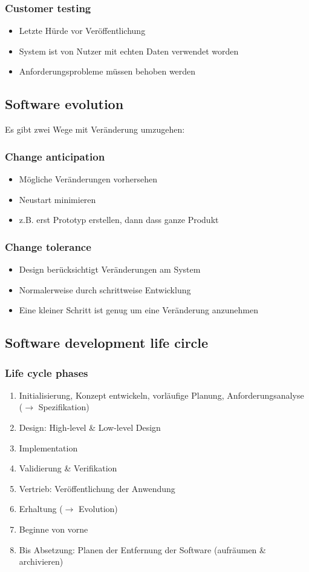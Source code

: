 \subsubsection{Customer testing}
\begin{itemize}
	\item Letzte Hürde vor Veröffentlichung
	\item System ist von Nutzer mit echten Daten verwendet worden
	\item Anforderungsprobleme müssen behoben werden
\end{itemize}
\subsection{Software evolution}
Es gibt zwei Wege mit Veränderung umzugehen:
\subsubsection{Change anticipation}
\begin{itemize}
	\item Mögliche Veränderungen vorhersehen
	\item Neustart minimieren
	\item z.B. erst Prototyp erstellen, dann dass ganze Produkt
\end{itemize}
\subsubsection{Change tolerance}
\begin{itemize}
	\item Design berücksichtigt Veränderungen am System
	\item Normalerweise durch schrittweise Entwicklung
	\item Eine kleiner Schritt ist genug um eine Veränderung anzunehmen
\end{itemize}
\subsection{Software development life circle}
\subsubsection{Life cycle phases}
\begin{enumerate}
	\item Initialisierung, Konzept entwickeln, vorläufige Planung, Anforderungsanalyse ($\rightarrow$ Spezifikation)
	\item Design: High-level \& Low-level Design
	\item Implementation
	\item Validierung \& Verifikation
	\item Vertrieb: Veröffentlichung der Anwendung
	\item Erhaltung ($\rightarrow$ Evolution)
	\item Beginne von vorne
	\item Bis Absetzung: Planen der Entfernung der Software (aufräumen \& archivieren) 
\end{enumerate}
